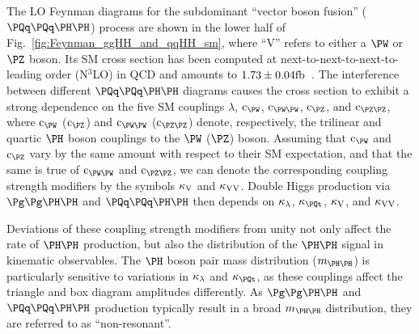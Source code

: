 The LO Feynman diagrams for the subdominant ``vector boson fusion'' ($\qqHH$) process are shown in the lower half of Fig.~\ref{fig:Feynman_ggHH_and_qqHH_sm},
where ``V'' refers to either a $\PW$ or $\PZ$ boson.
Its SM cross section has been computed at next-to-next-to-next-to-leading order (N$^{3}$LO) in QCD
and amounts to $1.73 \pm 0.04\text{fb}$~\cite{Dreyer:2018qbw}.
The interference between different $\qqHH$ diagrams causes the cross section to exhibit a strong dependence on the five SM couplings
$\lambda$, $\cW$, $\cWW$, $\cZ$, and $\cZZ$,
where $\cW$ ($\cZ$) and $\cWW$ ($\cZZ$) denote, respectively, the trilinear and quartic $\PHiggs$ boson couplings to the $\PW$ ($\PZ$) boson.
Assuming that $\cW$ and $\cZ$ vary by the same amount with respect to their SM expectation, and that the same is true of $\cWW$ and $\cZZ$,
we can denote the corresponding coupling strength modifiers by the symbols $\kappa_{\textrm{V}}$ and $\kappa_{\textrm{V}\textrm{V}}$. Double Higgs
production via $\ggHH$ and $\qqHH$ then depends on $\kappa_{\lambda}$, $\kappat$, $\kappa_{\textrm{V}}$, and $\kappa_{\textrm{V}\textrm{V}}$.

Deviations of these coupling strength modifiers from unity not only affect the rate of $\HH$ production,
but also the distribution of the $\HH$ signal in kinematic observables.
The $\PHiggs$ boson pair mass distribution ($\mHH$) is particularly sensitive to variations in $\kappa_{\lambda}$ and $\kappat$,
as these couplings affect the triangle and box diagram amplitudes differently.
As $\ggHH$ and $\qqHH$ production typically result in a broad $\mHH$ distribution,
they are referred to as ``non-resonant''.

